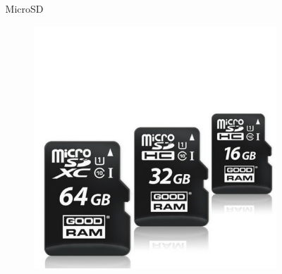 \documentclass[handout]{beamer}
\begin{document}
\begin{frame}
\begin{columns}
\begin{column}{.3\textwidth}
\begin{center}
\begin{figure}
    \end{figure}
  \end{center}
\end{column}
\begin{column}{.3\textwidth}
  \begin{center}
    MicroSD
    \begin{figure}
      \includegraphics[width=\columnwidth]{img/microsd.jpg}
    \end{figure}
  \end{center}
\end{column}
\end{columns}
\end{frame}
\end{document}
